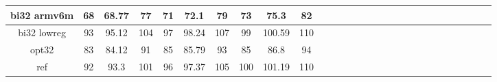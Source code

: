\documentclass[12pt,a4paper,italian]{report}
\begin{document}
\begin{landscape}
\begin{table}[]
\begin{adjustbox}{width=600pt}
\begin{tabular}{|c|c|c|c|c|c|c|c|c|c|c|c|c|c|c|c|c|c|c|c|c|c|c|c|c|c|c|c|}
				\hline
				bi32 armv6m & 68 & 68.77 & 77 & 71 & 72.1 & 79 & 73 & 75.3 & 82 & & & & & & & & & & & & & & & & & & \\
				\hline
				bi32 lowreg & 93 & 95.12 & 104 & 97 & 98.24 & 107 & 99 & 100.59 & 110 & & & & & & & & & & & & & & & & & & \\
				\hline
				opt32 & 83 & 84.12 & 91 & 85 & 85.79 & 93 & 85 & 86.8 & 94 & & & & & & & & & & & & & & & & & & \\
				\hline
				ref & 92 & 93.3 & 101 & 96 & 97.37 & 105 & 100 & 101.19 & 110 & & & & & & & & & & & & & & & & & & \\
				\hline
			\end{tabular}
		\end{adjustbox}
	\end{table}
\end{landscape}
\end{document}
